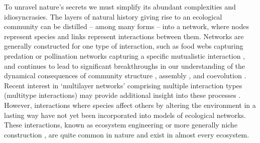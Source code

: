 \documentclass[twocolumn,preprintnumbers,amsmath,amssymb,superscriptaddress,linenumbers]{revtex4-1}
\begin{document}
\maketitle





To unravel nature's secrets we must simplify its abundant complexities and idiosyncrasies.
The layers of natural history giving rise to an ecological community can be distilled -- among many forms -- into a network, where nodes represent species and links represent interactions between them.
Networks are generally constructed for one type of interaction, such as food webs capturing predation \cite{Paine1966,Dunne2002,Pascual2006} or pollination networks capturing a specific mutualistic interaction \cite{Bascompte2013}, and continues to lead to significant breakthroughs in our understanding of the dynamical consequences of community structure \cite{May1972,Gross2009,Allesina2012}, assembly \cite{Ponisio2017}, and coevolution \cite{Guimaraes2017}. 
Recent interest in `multilayer networks' comprising multiple interaction types (multitype interactions) may provide additional insight into these processes \cite{Kefi2016,Pilosof2017}. 
However, interactions where species affect others by altering the environment in a lasting way have not yet been incorporated into models of ecological networks. 
These interactions, known as ecosystem engineering \cite{Lawton1994,OdlingSmee2013} or more generally niche construction \cite{OdlingSmee2013b,Fukami2015}, are quite common in nature and exist in almost every ecosystem.
\end{document}

